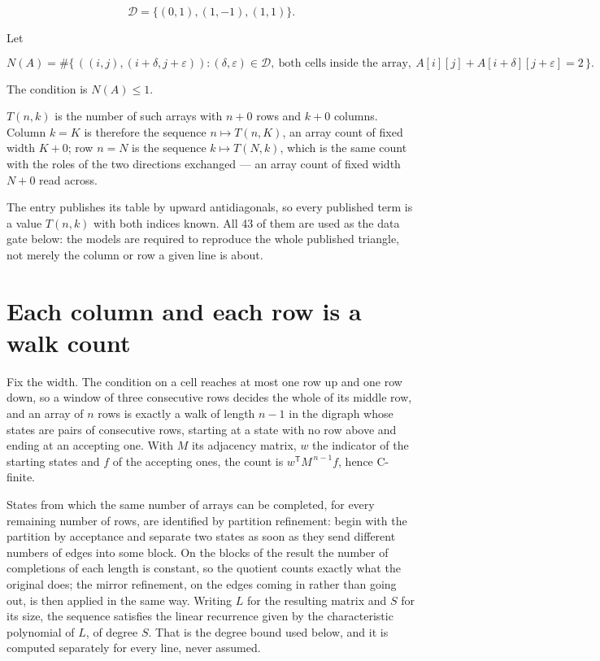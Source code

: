 \documentclass[11pt]{article}
\theoremstyle{definition}
\begin{document}
\[\mathcal{D} = \{(0,1), (1,-1), (1,1)\}.\]

Let

\[N(A) = \#\bigl\{\,((i,j),(i{+}\delta,j{+}\varepsilon)) : (\delta,\varepsilon) \in \mathcal{D},\ \text{both cells inside the array},\ A[i][j] + A[i{+}\delta][j{+}\varepsilon] = 2\,\bigr\}.\]

The condition is $N(A) \le 1$.

$T(n,k)$ is the number of such arrays with $n + 0$ rows and $k + 0$ columns. Column $k = K$ is therefore the sequence $n \mapsto T(n,K)$, an array count of fixed width $K + 0$; row $n = N$ is the sequence $k \mapsto T(N,k)$, which is the same count with the roles of the two directions exchanged --- an array count of fixed width $N + 0$ read across.

The entry publishes its table by upward antidiagonals, so every published term is a value $T(n,k)$ with both indices known. All 43 of them are used as the data gate below: the models are required to reproduce the whole published triangle, not merely the column or row a given line is about.

\section{Each column and each row is a walk count}

Fix the width. The condition on a cell reaches at most one row up and one row down, so a window of three consecutive rows decides the whole of its middle row, and an array of $n$ rows is exactly a walk of length $n-1$ in the digraph whose states are pairs of consecutive rows, starting at a state with no row above and ending at an accepting one. With $M$ its adjacency matrix, $w$ the indicator of the starting states and $f$ of the accepting ones, the count is $w^{\mathsf T}M^{\,n-1}f$, hence C-finite.

States from which the same number of arrays can be completed, for every remaining number of rows, are identified by partition refinement: begin with the partition by acceptance and separate two states as soon as they send different numbers of edges into some block. On the blocks of the result the number of completions of each length is constant, so the quotient counts exactly what the original does; the mirror refinement, on the edges coming in rather than going out, is then applied in the same way. Writing $L$ for the resulting matrix and $S$ for its size, the sequence satisfies the linear recurrence given by the characteristic polynomial of $L$, of degree $S$. That is the degree bound used below, and it is computed separately for every line, never assumed.
\end{document}

